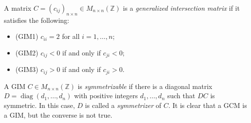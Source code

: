 \documentclass[12pt,reqno]{amsart}
\numberwithin{equation}{section}
\begin{document}
	A matrix ${C}=(c_{ij})_{n\times n}\in M_{n\times n}(\mathbb{Z})$ is a {\em generalized intersection matrix}  if it satisfies the following:
	\begin{itemize}
		\item[](GIM1) $c_{ii}=2$ for all $i=1,\ldots,n$;
		\item[](GIM2) $c_{ij}< 0$ if and only if $c_{ji}<0$;
		\item[](GIM3) $c_{ij}>0$ if and only if $c_{ji}>0$.
	\end{itemize}
	A GIM $C\in M_{n\times n}(\mathbb{Z})$ is {\em symmetrizable} if there is a diagonal matrix $D=\operatorname{diag}(d_1,\ldots,d_n)$ with positive integers $d_1,\ldots,d_n$ such that $DC$ is symmetric. In this case, $D$ is called a {\em symmetrizer} of $C$.
	It is clear that a GCM is a GIM, but the converse is not true.
	
\end{document}
